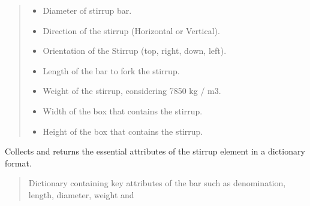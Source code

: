 \documentclass[a4paper,10pt,english]{sphinxmanual}
\begin{document}
\begin{fulllineitems}
\begin{quote}
\begin{description}
\begin{itemize}
\item {} 
\sphinxAtStartPar
{} \textendash{} Diameter of stirrup bar.

\item {} 
\sphinxAtStartPar
{} \textendash{} Direction of the stirrup (Horizontal or Vertical).

\item {} 
\sphinxAtStartPar
{} \textendash{} Orientation of the Stirrup (top, right, down, left).

\item {} 
\sphinxAtStartPar
{} \textendash{} Length of the bar to fork the stirrup.

\item {} 
\sphinxAtStartPar
{} \textendash{} Weight of the stirrup, considering 7850 kg / m3.

\item {} 
\sphinxAtStartPar
{} \textendash{} Width of the box that contains the stirrup.

\item {} 
\sphinxAtStartPar
{} \textendash{} Height of the box that contains the stirrup.

\end{itemize}

\end{description}\end{quote}

\begin{fulllineitems}
\label{\detokenize{API:etacad.stirrup.Stirrup.data}}
\pysigstartsignatures
{}
\pysigstopsignatures
\sphinxAtStartPar
Collects and returns the essential attributes of the stirrup element in a dictionary format.
\begin{quote}\begin{description}
\sphinxAtStartPar
Dictionary containing key attributes of the bar such as denomination, length, diameter, weight and

\end{description}\end{quote}


\end{fulllineitems}
\end{fulllineitems}
\end{document}
